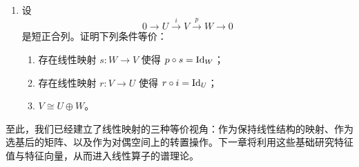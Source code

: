 \begin{enumerate}[label=\textbf{\arabic*.}, leftmargin=3.5em, start=56]
\[  \]
  是满射，且诱导同构
  \[
    V^*/U^0\cong U^*.
  \]
  \item {\hard} 设
  \[
    0\longrightarrow U\overset{i}{\longrightarrow} V\overset{p}{\longrightarrow} W\longrightarrow 0
  \]
  是短正合列。证明下列条件等价：
  \begin{enumerate}[label=\textnormal{(\alph*)}]
    \item 存在线性映射 $s\colon W\to V$ 使得 $p\circ s=\mathrm{Id}_W$；
    \item 存在线性映射 $r\colon V\to U$ 使得 $r\circ i=\mathrm{Id}_U$；
    \item $V\cong U\oplus W$。
  \end{enumerate}
\end{enumerate}

至此，我们已经建立了线性映射的三种等价视角：作为保持线性结构的映射、作为选基后的矩阵、以及作为对偶空间上的转置操作。下一章将利用这些基础研究特征值与特征向量，从而进入线性算子的谱理论。





